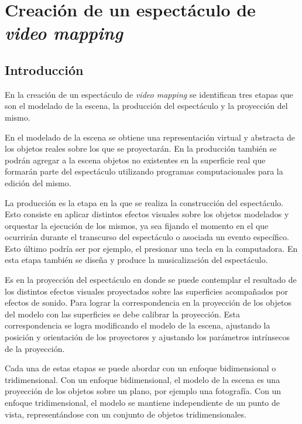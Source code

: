 \chapter{Creación de un espectáculo de \emph{video mapping}}

\section{Introducción}
En la creación de un espectáculo de \emph{video mapping} se identifican tres etapas que son el modelado de la escena, la producción del espectáculo y la proyección del mismo.

En el modelado de la escena se obtiene una representación virtual y abstracta de los objetos reales sobre los que se proyectarán. En la producción también se podrán agregar a la escena objetos no existentes en la superficie real que formarán parte del espectáculo utilizando programas computacionales para la edición del mismo.

La producción es la etapa en la que se realiza la construcción del espectáculo. Esto consiste en aplicar distintos efectos visuales sobre los objetos modelados y orquestar la ejecución de los mismos, ya sea fijando el momento en el que ocurrirán durante el transcurso del espectáculo o asociada un evento específico. Esto último podría ser por ejemplo, el presionar una tecla en la computadora.
En esta etapa también se diseña y produce la musicalización del espectáculo.

Es en la proyección del espectáculo en donde se puede contemplar el resultado de los distintos efectos visuales proyectados sobre las superficies acompañados por efectos de sonido.
Para lograr la correspondencia en la proyección de los objetos del modelo con las superficies se debe calibrar la proyección. Esta correspondencia se logra modificando el modelo de la escena, ajustando la posición y orientación de los proyectores y ajustando los parámetros intrínsecos de la proyección.

Cada una de estas etapas se puede abordar con un enfoque bidimensional o tridimensional.
Con un enfoque bidimensional, el modelo de la escena es una proyección de los objetos sobre un plano, por ejemplo una fotografía. Con un enfoque tridimensional, el modelo se mantiene independiente de un punto de vista, representándose con un conjunto de objetos tridimensionales.

